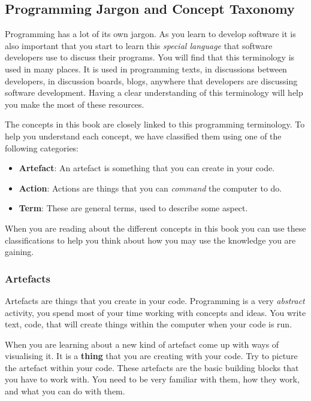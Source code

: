 \clearpage
\subsection{Programming Jargon and Concept Taxonomy} %
\label{sub:concept_taxonomy}

Programming has a lot of its own jargon. As you learn to develop software it is also important that you start to learn this \emph{special language} that software developers use to discuss their programs. You will find that this terminology is used in many places. It is used in programming texts, in discussions between developers, in discussion boards, blogs, anywhere that developers are discussing software development. Having a clear understanding of this terminology will help you make the most of these resources.

The concepts in this book are closely linked to this programming terminology. To help you understand each concept, we have classified them using one of the following categories:

\begin{itemize}
  \item \textbf{Artefact}: An artefact is something that you can create in your code.
  \item \textbf{Action}: Actions are things that you can \emph{command} the computer to do.
  \item \textbf{Term}: These are general terms, used to describe some aspect.
\end{itemize}

When you are reading about the different concepts in this book you can use these classifications to help you think about how you may use the knowledge you are gaining.

\subsubsection{Artefacts} %
\label{ssub:artefacts}

Artefacts are things that you create in your code. Programming is a very \emph{abstract} activity, you spend most of your time working with concepts and ideas. You write text, code, that will create things within the computer when your code is run. 

When you are learning about a new kind of artefact come up with ways of visualising it. It is a \textbf{thing} that you are creating with your code. Try to picture the artefact within your code. These artefacts are the basic building blocks that you have to work with. You need to be very familiar with them, how they work, and what you can do with them.

